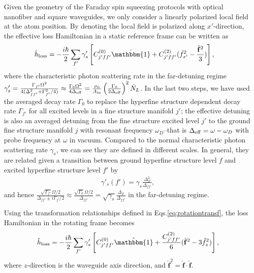 \documentclass[preprint,aps,pra,onecolumn,superscriptaddress]{revtex4-1} %
\newcommand{\Ain}{A_{\rm in}}
\begin{document}
\begin{appendix}
Given the geometry of the Faraday spin squeezing protocols with optical nanofiber and square waveguides, we only consider a linearly polarized local field at the atom position. 
By denoting the local field is polarized along $ x'$-direction, the effective loss Hamiltonian in a static reference frame can be written as 
\begin{align}
\hat{h}_{\rm loss} &= -\frac{i\hbar}{2}\sum_{f'} \gamma'_s \left[C_{j'ff'}^{(0)}\hat{\mathbbm{1}}+C_{j'ff'}^{(2)}(\hat{f}_{x'}^2-\frac{\hat{\mathbf{f}}^2}{3} ) \right],
\end{align}
where the characteristic photon scattering rate in the far-detuning regime $ \gamma'_s=\frac{\Gamma_{f'}\Omega^2}{4(\Delta_{ff'}^2+\Gamma_{f'}^2/4 )} \approx \frac{\Gamma_0\Omega^2}{4\Delta_{\rm eff}}=\frac{\sigma_0}{\Ain}\left(\frac{\Gamma_0}{2\Delta_{\rm eff}} \right)^2\dot{N}_L $.
In the last two steps, we have used the averaged decay rate $ \Gamma_0 $ to replace the hyperfine structure dependent decay rate $ \Gamma_{f'} $ for all excited levels in a fine structure manifold $ j' $; the effective detuning is also an averaged detuning from the fine structure excited level $ j' $ to the ground fine structure manifold $ j $ with resonant frequency $ \omega_D $--that is $ \Delta_{\rm eff}=\omega -\omega_D $ with probe frequency at $ \omega $ in vacuum. 
Compared to the normal characteristic photon scattering rate $ \gamma_s $, we can see they are defined in different scales.
In general, they are related given a transition between ground hyperfine structure level $ f $ and excited hyperfine structure level $ f' $ by 
\begin{align}
\gamma'_s(f')=\gamma_s \frac{\Delta_F^2}{\Delta_{ff'}},
\end{align}
and hence $ \frac{\sqrt{\Gamma_{f'}}\Omega/2}{\Delta_{ff'}\pm i\Gamma_{f'}/2}\approx \frac{\sqrt{\Gamma_0}\Omega/2}{\Delta_{ff'}}=\sqrt{\gamma_s}\frac{\Delta_F}{\Delta_{ff'}} $ in the far-detuning regime.

Using the transformation relationships defined in Eqs.\eqref{eq:rotationtransf}, the loss Hamiltonian in the rotating frame becomes
\begin{subequations}\label{eq:rotationtransf_hloss}
\begin{align}
\hat{h}_{\rm loss} =-\frac{i\hbar}{2} \sum_{f'}\gamma'_s \left[C_{j'ff'}^{(0)}\hat{\mathbbm{1}} + \frac{C_{j'ff'}^{(2)}}{6}(\hat{\mathbf{f}}^2-3\hat{f}_z^2 ) \right],
\end{align}
\end{subequations}
where $ z $-direction is the waveguide axis direction, and $ \hat{\mathbf{f}}^2=\hat{\mathbf{f}}\cdot\hat{\mathbf{f}} $.


\end{appendix}
\end{document}

